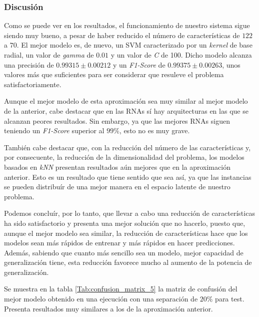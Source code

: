 \documentclass[12pt]{article}
\begin{document}
\subsubsection{Discusión}

Como se puede ver en los resultados, el funcionamiento de nuestro sistema sigue siendo
muy bueno, a pesar de haber reducido el número de  características de $122$ a $70$. 
El mejor modelo es, de nuevo, un SVM caracterizado por un \textit{kernel} de base radial,
un valor de \textit{gamma} de $0.01$ y un valor de \textit{C} de 100. Dicho modelo alcanza una precisión
de $0.99315 \pm 0.00212$ y un \textit{F1-Score} de $0.99375 \pm 0.00263$,
unos valores más que suficientes para ser considerar que resuleve el problema satisfactoriamente. 

\bigskip
Aunque el mejor modelo de esta aproximación sea muy similar al mejor
modelo de la anterior, cabe destacar que en las RNAs sí hay
arquitecturas en las que se alcanzan peores resultados. Sin embargo, ya que las mejores RNAs siguen 
teniendo un \textit{F1-Score} superior al $99\%$, esto no es muy grave.

\bigskip
También cabe destacar que, con la reducción del número de las características y,
por consecuente, la reducción de la dimensionalidad del problema, los modelos basados
en \textit{kNN} presentan resultados aún mejores que en la aproximación anterior.
Esto es un resultado que tiene sentido que sea así, ya que las instancias se pueden
distribuír de una mejor manera en el espacio latente de nuestro problema.

\bigskip
Podemos concluír, por lo tanto, que llevar a cabo una reducción de características ha sido
satisfactorio y presenta una mejor solución que no hacerlo, puesto que, aunque el mejor
modelo sea similar, la reducción de características hace que los modelos sean más rápidos
de entrenar y más rápidos en hacer predicciones. Además, sabiendo que cuanto más sencillo sea un modelo, mejor capacidad
de generalización tiene, esta reducción favorece mucho al aumento de la potencia de
generalización.

\bigskip
Se muestra en la tabla \ref{Tab:confusion_matrix_5} la matriz de confusión del mejor
modelo obtenido en una ejecución con una separación de $20\%$ para test. Presenta
resultados muy similares a los de la aproximación anterior.
\end{document}
